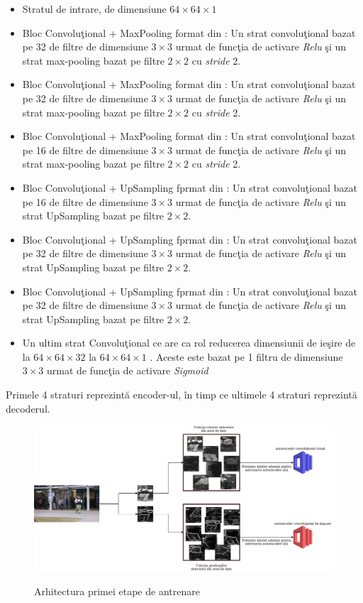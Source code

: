 \documentclass[a4paper,12pt]{report}
\begin{document}
\begin{itemize}
\item Stratul de intrare, de dimensiune \( 64 \times 64 \times 1\)
\item Bloc  Convoluţional + MaxPooling format din : Un strat convoluţional bazat pe 32 de filtre de dimensiune \(3 \times 3\) urmat de funcţia de activare \emph{Relu} şi un strat max-pooling bazat pe filtre \(2 \times 2\) cu \emph{stride} 2.
\item Bloc  Convoluţional + MaxPooling format din : Un strat convoluţional bazat pe 32 de filtre de dimensiune \(3 \times 3\) urmat de funcţia de activare \emph{Relu} şi un strat max-pooling bazat pe filtre \(2 \times 2\) cu \emph{stride} 2.
\item Bloc  Convoluţional + MaxPooling format din : Un strat convoluţional bazat pe 16 de filtre de dimensiune \(3 \times 3\) urmat de funcţia de activare \emph{Relu} şi un strat max-pooling bazat pe filtre \(2 \times 2\) cu \emph{stride} 2.
\item Bloc Convoluţional + UpSampling fprmat din : Un strat convoluţional bazat pe 16 de filtre de dimensiune \(3 \times 3\) urmat de funcţia de activare \emph{Relu} şi un strat UpSampling bazat pe filtre \(2 \times 2\).
\item Bloc Convoluţional + UpSampling fprmat din : Un strat convoluţional bazat pe 32 de filtre de dimensiune \(3 \times 3\) urmat de funcţia de activare \emph{Relu} şi un strat UpSampling bazat pe filtre \(2 \times 2\).
\item Bloc Convoluţional + UpSampling fprmat din : Un strat convoluţional bazat pe 32 de filtre de dimensiune \(3 \times 3\) urmat de funcţia de activare \emph{Relu} şi un strat UpSampling bazat pe filtre \(2 \times 2\).
\item Un ultim strat Convoluţional ce are ca rol reducerea dimensiunii de ieşire de la \(64 \times 64 \times 32\) la \(64 \times 64 \times 1\)\cite{ionescu2019object} .  Aceste este bazat pe 1 filtru de dimensiune \(3 \times 3 \) urmat de funcţia de activare \emph{Sigmoid}
\end{itemize}
Primele 4 straturi reprezintă encoder-ul, în timp ce ultimele 4 straturi reprezintă decoderul. 
\clearpage
\begin{figure}[h]
\begin{center}
        \includegraphics[width=1\textwidth]{images/training_stage1_architecture}
			 \label{fig:stage1_architecture}
			 \caption{Arhitectura primei etape de antrenare}
\end{center}
\end{figure}
\end{document}
